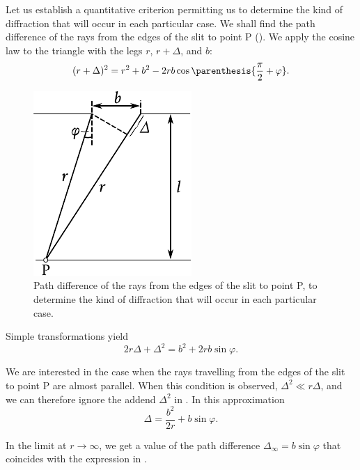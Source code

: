 Let us establish a quantitative criterion permitting us to determine the kind of diffraction that will occur in each particular case.
We shall find the path difference of the rays from the edges of the slit to point P ().
We apply the cosine law to the triangle with the legs $r$, $r+\Delta$, and $b$:
\begin{equation*}
	(r+\Delta)^2 = r^2 + b^2 - 2rb \cos\parenthesis{\frac{\pi}{2} + \varphi}.
\end{equation*}

\begin{figure}[!htb]
	\begin{center}
		\includegraphics[scale=1]{figures/ch_18/fig_18_30.pdf}
        \caption[]{Path difference of the rays from the edges of the slit to point P, to determine the kind of diffraction that will occur in each particular case.}
		\label{fig:18_30}
	\end{center}
	\vspace{-0.8cm}
\end{figure}

Simple transformations yield
\begin{equation}\label{eq:18_31}
	2r\Delta + \Delta^2 = b^2 + 2rb \sin\varphi.
\end{equation}

\noindent
We are interested in the case when the rays travelling from the edges of the slit to point P are almost parallel.
When this condition is observed, $\Delta^2\ll r\Delta$, and we can therefore ignore the addend $\Delta^2$ in .
In this approximation
\begin{equation}\label{eq:18_32}
	\Delta = \frac{b^2}{2r} + b \sin\varphi.
\end{equation}

\noindent
In the limit at $r\to\infty$, we get a value of the path difference $\Delta_{\infty}=b \sin\varphi$ that coincides with the expression in .

